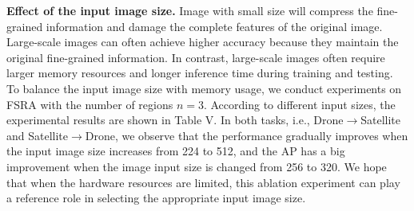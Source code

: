 \documentclass[lettersize,journal]{IEEEtran}
\begin{document}
\begin{table}[h]
\tiny
\renewcommand\arraystretch{1.4}
\caption{Ablation study on the impact of different input sizes on University-1652. The experimental results are based on the number of sampling k=1, triple loss with margin=0.3.}
\label{table5}
\end{table}

\textbf{Effect of the input image size.} Image with small size will compress the fine-grained information and damage the complete features of the original image. Large-scale images can often achieve higher accuracy because they maintain the original fine-grained information. In contrast, large-scale images often require larger memory resources and longer inference time during training and testing. To balance the input image size with memory usage, we conduct experiments on FSRA with the number of regions $n=3$. According to different input sizes, the experimental results are shown in Table V. In both tasks, i.e., Drone$\rightarrow$Satellite and Satellite$\rightarrow$Drone, we observe that the performance gradually improves when the input image size increases from 224 to 512, and the AP has a big improvement when the image input size is changed from 256 to 320. We hope that when the hardware resources are limited, this ablation experiment can play a reference role in selecting the appropriate input image size. 
\end{document}
